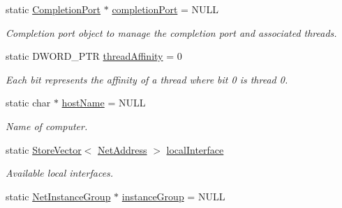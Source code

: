 \begin{DoxyCompactItemize}
\item 
\hypertarget{class_net_utility_a3e4da37b0d11d4139eb5775fca3c60bb}{
static \hyperlink{class_completion_port}{CompletionPort} $\ast$ \hyperlink{class_net_utility_a3e4da37b0d11d4139eb5775fca3c60bb}{completionPort} = NULL}
\label{class_net_utility_a3e4da37b0d11d4139eb5775fca3c60bb}

\begin{DoxyCompactList}\small\item\em Completion port object to manage the completion port and associated threads. \item\end{DoxyCompactList}\item 
\hypertarget{class_net_utility_ad9d1d141652dc99f04138bf151f627ab}{
static DWORD\_\-PTR \hyperlink{class_net_utility_ad9d1d141652dc99f04138bf151f627ab}{threadAffinity} = 0}
\label{class_net_utility_ad9d1d141652dc99f04138bf151f627ab}

\begin{DoxyCompactList}\small\item\em Each bit represents the affinity of a thread where bit 0 is thread 0. \item\end{DoxyCompactList}\item 
\hypertarget{class_net_utility_a320e6e50166990f3b464c20b74a00979}{
static char $\ast$ \hyperlink{class_net_utility_a320e6e50166990f3b464c20b74a00979}{hostName} = NULL}
\label{class_net_utility_a320e6e50166990f3b464c20b74a00979}

\begin{DoxyCompactList}\small\item\em Name of computer. \item\end{DoxyCompactList}\item 
\hypertarget{class_net_utility_a866404414ea61d08df9a1e8c99bdd28a}{
static \hyperlink{class_store_vector}{StoreVector}$<$ \hyperlink{class_net_address}{NetAddress} $>$ \hyperlink{class_net_utility_a866404414ea61d08df9a1e8c99bdd28a}{localInterface}}
\label{class_net_utility_a866404414ea61d08df9a1e8c99bdd28a}

\begin{DoxyCompactList}\small\item\em Available local interfaces. \item\end{DoxyCompactList}\item 
\hypertarget{class_net_utility_ae43bb23b8d8fb7d0150b50e01ed4d227}{
static \hyperlink{class_net_instance_group}{NetInstanceGroup} $\ast$ \hyperlink{class_net_utility_ae43bb23b8d8fb7d0150b50e01ed4d227}{instanceGroup} = NULL}
\label{class_net_utility_ae43bb23b8d8fb7d0150b50e01ed4d227}


\end{DoxyCompactItemize}
